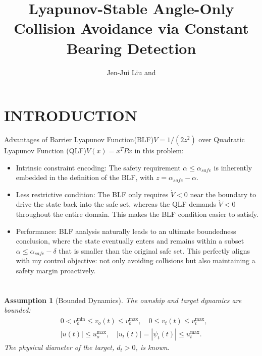 \documentclass[10pt]{article}
\title{\LARGE \bf
Lyapunov-Stable Angle-Only Collision Avoidance via Constant Bearing Detection
}
\author{Jen-Jui Liu and %
}
\newtheorem{assumption}{Assumption}
\begin{document}
\maketitle
\thispagestyle{empty}
\pagestyle{empty}


\begin{abstract}



\end{abstract}

\section{INTRODUCTION}

Advantages of Barrier Lyapunov Function(BLF)$V = 1/(2z^2)$ over Quadratic Lyapunov Function (QLF)$V(x) = x^T P x$ in this problem:
\begin{itemize}
    \item Intrinsic constraint encoding: The safety requirement $\alpha \leq \alpha_{safe}$ is inherently embedded in the definition of the BLF, with $z = \alpha_{safe} - \alpha$.

    \item Less restrictive condition: The BLF only requires $\dot{V} < 0$ near the boundary to drive the state back into the safe set, whereas the QLF demands $\dot{V} < 0$ throughout the entire domain. This makes the BLF condition easier to satisfy.

    \item Performance: BLF analysis naturally leads to an ultimate boundedness conclusion, where the state eventually enters and remains within a subset $\alpha \leq \alpha_{safe}-\delta$ that is smaller than the original safe set. This perfectly aligns with my control objective: not only avoiding collisions but also maintaining a safety margin proactively.
\end{itemize}
\section{}

\begin{assumption}[Bounded Dynamics]\label{assump:bounds}
    The ownship and target dynamics are bounded:
    \begin{align*}
        &0 < v_o^{\min} \leq v_o(t) \leq v_o^{\max}, \quad
        0 \leq v_t(t) \leq v_t^{\max}, \\
        &|u(t)| \leq u_o^{\max}, \quad
        |u_t(t)| = |\dot{\psi}_t(t)| \leq u_t^{\max}.
    \end{align*}
    The physical diameter of the target, $d_t > 0$, is known.
\end{assumption}
\end{document}
